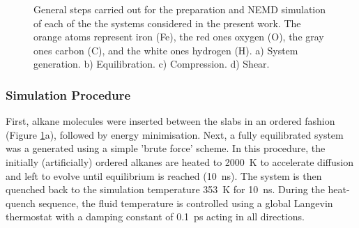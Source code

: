 \documentclass[aps,prb,reprint,superscriptaddress, a4paper]{revtex4-1}
\begin{document}
\begin{figure}
\begin{center}

		\caption{General steps carried out for the preparation and NEMD simulation of   each of the the systems considered in the present work. The orange atoms represent iron (Fe), the red ones oxygen (O), the gray ones carbon (C), and the white ones hydrogen (H). a) System generation. b) Equilibration. c) Compression. d) Shear. }
		\label{fig:Steps}
	\end{center}
\end{figure}

\subsubsection{Simulation Procedure}

First, alkane molecules were inserted between the slabs in an ordered fashion (Figure \ref{fig:Steps}a), followed by energy minimisation. Next, a fully equilibrated system was a generated using a simple 'brute force' scheme. In this procedure, the initially (artificially) ordered alkanes are heated to \SI{2000}{\kelvin} to accelerate diffusion and left to evolve until equilibrium is reached (\SI{10}{\nano\second}). The system is then quenched back to the simulation temperature \SI{353}{\kelvin} for \SI{10}{\nano\second}. During the heat-quench sequence, the fluid temperature is controlled using a global Langevin thermostat \cite{Schneider1978} with a damping constant of \SI{0.1}{\pico\second} acting in all directions.
\end{document}
